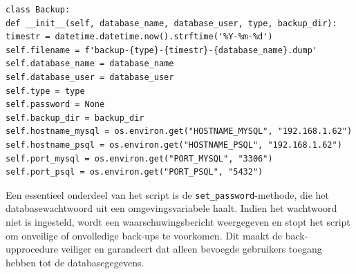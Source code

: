 \begin{lstlisting}[language=script, caption={Backup-klasse van het python-script.}]
class Backup:
def __init__(self, database_name, database_user, type, backup_dir):
timestr = datetime.datetime.now().strftime('%Y-%m-%d')
self.filename = f'backup-{type}-{timestr}-{database_name}.dump'
self.database_name = database_name
self.database_user = database_user
self.type = type
self.password = None
self.backup_dir = backup_dir
self.hostname_mysql = os.environ.get("HOSTNAME_MYSQL", "192.168.1.62")
self.hostname_psql = os.environ.get("HOSTNAME_PSQL", "192.168.1.62")
self.port_mysql = os.environ.get("PORT_MYSQL", "3306")
self.port_psql = os.environ.get("PORT_PSQL", "5432")
\end{lstlisting}

Een essentieel onderdeel van het script is de \texttt{set\_password}-methode, die het databasewachtwoord uit een omgevingsvariabele haalt. Indien het wachtwoord niet is ingesteld, wordt een waarschuwingsbericht weergegeven en stopt het script om onveilige of onvolledige back-ups te voorkomen. Dit maakt de back-upprocedure veiliger en garandeert dat alleen bevoegde gebruikers toegang hebben tot de databasegegevens.

